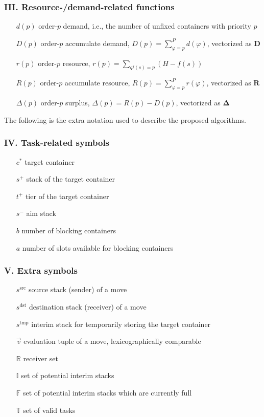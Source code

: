 \documentclass[review,3p,times,12pt,number]{elsarticle}\usepackage{amsmath}\usepackage{amssymb}
\newcommand{\mss}{s^\mathrm{src}}
\newcommand{\mds}{s^\mathrm{dst}}
\newcommand{\mts}{s^\mathrm{tmp}}
\begin{document}
\subsubsection*{III\@. Resource-{\slash}demand-related functions}
\begin{enumerate}[noitemsep, align=LabelCenter,labelwidth=\mylongest,leftmargin=!]
\item[$d(p)$] order-$p$ demand, i.e., the number of unfixed containers with priority $p$
\item[$D(p)$] order-$p$ accumulate demand, $D(p)=\sum_{\varphi=p}^P d(\varphi)$, vectorized as $\boldsymbol{D}$
\item[$r(p)$] order-$p$ resource, $r(p)=\sum_{q^f(s)=p} (H-f(s))$
\item[$R(p)$] order-$p$ accumulate resource, $R(p)=\sum_{\varphi=p}^P r(\varphi)$, vectorized as $\boldsymbol{R}$
\item[$\Delta(p)$] order-$p$ surplus, $\Delta(p)=R(p)-D(p)$, vectorized as $\boldsymbol{\Delta}$
\end{enumerate}

The following is the extra notation used to describe the proposed algorithms.


\subsubsection*{IV\@. Task-related symbols}
\begin{enumerate}[noitemsep, align=LabelCenter,labelwidth=\mylongest,leftmargin=!]
\item[$c^*$] target container
\item[$s^+$] stack of the target container
\item[$t^+$] tier of the target container
\item[$s^-$] aim stack
\item[$b$] number of blocking containers
\item[$a$] number of slots available for blocking containers
\end{enumerate}

\subsubsection*{V\@. Extra symbols}
\begin{enumerate}[noitemsep, align=LabelCenter,labelwidth=\mylongest,leftmargin=!]
\item[$\mss$] source stack (sender) of a move
\item[$\mds$] destination stack (receiver) of a move
\item[$\mts$] interim stack for temporarily storing the target container
\item[$\vec{v}$] evaluation tuple of a move, lexicographically comparable\item[$\mathbb{R}$] receiver set
\item[$\mathbb{I}$] set of potential interim stacks
\item[$\mathbb{F}$] set of potential interim stacks which are  currently full
\item[$\mathbb{T}$] set of valid tasks
\end{enumerate}
\end{document}
